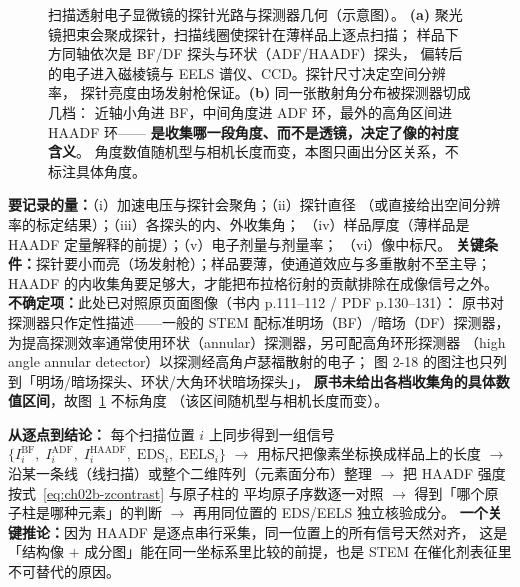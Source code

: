 \begin{figure}[htbp]
\caption{扫描透射电子显微镜的探针光路与探测器几何（示意图）。
\textbf{(a)} 聚光镜把束会聚成探针，扫描线圈使探针在薄样品上逐点扫描；
样品下方同轴依次是 BF/DF 探头与环状（ADF/HAADF）探头，
偏转后的电子进入磁棱镜与 EELS 谱仪、CCD。探针尺寸决定空间分辨率，
探针亮度由场发射枪保证。\textbf{(b)} 同一张散射角分布被探测器切成几档：
近轴小角进 BF，中间角度进 ADF 环，最外的高角区间进 HAADF 环——
\textbf{是收集哪一段角度、而不是透镜，决定了像的衬度含义}。
角度数值随机型与相机长度而变，本图只画出分区关系，不标注具体角度。
\schemamark\redrawmark{}}
\label{fig:ch02b-stem}
\end{figure}

\begin{measure}
\textbf{要记录的量：}（i）加速电压与探针会聚角；（ii）探针直径
（或直接给出空间分辨率的标定结果）；（iii）各探头的内、外收集角；
（iv）样品厚度（薄样品是 HAADF 定量解释的前提）；（v）电子剂量与剂量率；
（vi）像中标尺。
\textbf{关键条件：}探针要小而亮（场发射枪）；样品要薄，使通道效应与多重散射不至主导；
HAADF 的内收集角要足够大，才能把布拉格衍射的贡献排除在成像信号之外。
\textbf{不确定项：}此处已对照原页面图像（书内 p.111--112 / PDF p.130--131）：
原书对探测器只作定性描述——一般的 STEM 配标准明场（BF）/暗场（DF）探测器，
为提高探测效率通常使用环状（annular）探测器，另可配高角环形探测器
（high angle annular detector）以探测经高角卢瑟福散射的电子；
图 2-18 的图注也只列到「明场/暗场探头、环状/大角环状暗场探头」，
\textbf{原书未给出各档收集角的具体数值区间}，故图~\ref{fig:ch02b-stem} 不标角度
（该区间随机型与相机长度而变）。
\end{measure}

\begin{dataflow}
\textbf{从逐点到结论：}
每个扫描位置 $i$ 上同步得到一组信号
$\{I^{\mathrm{BF}}_i,\;I^{\mathrm{ADF}}_i,\;I^{\mathrm{HAADF}}_i,\;\mathrm{EDS}_i,\;\mathrm{EELS}_i\}$
$\rightarrow$ 用标尺把像素坐标换成样品上的长度
$\rightarrow$ 沿某一条线（线扫描）或整个二维阵列（元素面分布）整理
$\rightarrow$ 把 HAADF 强度按式~\eqref{eq:ch02b-zcontrast} 与原子柱的
平均原子序数逐一对照 $\rightarrow$ 得到「哪个原子柱是哪种元素」的判断
$\rightarrow$ 再用同位置的 EDS/EELS 独立核验成分。
\textbf{一个关键推论：}因为 HAADF 是逐点串行采集，同一位置上的所有信号天然对齐，
这是「结构像 $+$ 成分图」能在同一坐标系里比较的前提，也是 STEM 在催化剂表征里
不可替代的原因。
\end{dataflow}


